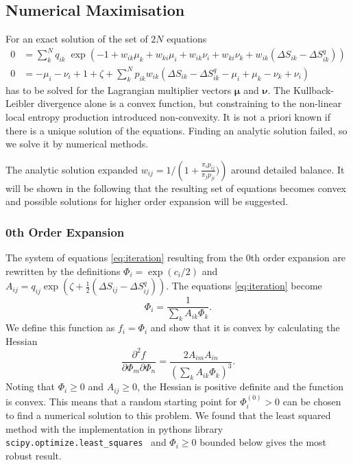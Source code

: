 \subsection{Numerical Maximisation}
\label{sec:numerics}
For an exact solution of the set of $2N$ equations 
\begin{equation}
 \begin{aligned}
 0 &=\sum_k^N q_{ik} \; \exp \left ( -1 + w_{ik} \mu_k + w_{ki} \mu_i 
  + w_{ik} \nu_i + w_{ki} \nu_k + w_{ik} ( \Delta S_{ik} - \Delta S_{ik}^q )  \right )  \\
0&= - \mu_i - \nu_i + 1 + \zeta + \sum_k^N p_{ik} w_{ik} \left ( \Delta S_{ik} - \Delta S_{ik}^q -\mu_i +\mu_k -\nu_k +\nu_i \right )    
 \end{aligned}
\label{eq:fullsol}
\end{equation}
has to be solved for the Lagrangian multiplier vectors $\bm{\mu}$ and $\bm{\nu}$. The Kullback-Leibler divergence alone is a convex function, but constraining to the non-linear local entropy production introduced non-convexity. It is not a priori known if there is a unique solution of the equations. Finding an analytic solution failed, so we solve it by numerical methods. 

The analytic solution expanded $w_{ij} = 1/\left(1 + \frac{\pi_i p_{ij}}{\pi_j p_{ji}} ) \right)$ around detailed balance. It will be shown in the following that the resulting set of equations becomes convex and possible solutions for higher order expansion will be suggested.  


\subsubsection{0th Order Expansion}
The system of equations \ref{eq:iteration} resulting from the 0th order expansion are rewritten by the definitions $\Phi_i = \exp (c_i/2 )$ and $A_{ij} = q_{ij}\exp \left ( \zeta+ \frac{1}{2} \left (  \Delta S_{ij} - \Delta S_{ij}^q \right ) \right )$. 
The equations \ref{eq:iteration} become 
\begin{equation}
  \Phi_i = \frac{1}{\sum_k A_{ik} \Phi_k}.
\end{equation}
We define this function as $f_i= \Phi_i$ and show that it is convex by calculating the Hessian
\begin{equation}
    \frac{\partial^2 f}{ \partial \Phi_m \partial \Phi_n} =  \frac{2 A_{im} 
A_{in}}{\left ( \sum_k A_{ik} \Phi_k \right )^3}.
\end{equation}
Noting that $\Phi_i  \geq 0$ and $A_{ij} \geq 0$, the Hessian is 
positive definite and the function is convex. This means that a random starting point for $\Phi_i^{(0)}> 0$  can be chosen to find a numerical solution to this problem. We found that the least squared method with the implementation in pythons library \lstinline{scipy.optimize.least_squares}~\cite{branch1999subspace} and $\Phi_i\geq 0$ bounded below  gives the most robust result. 

